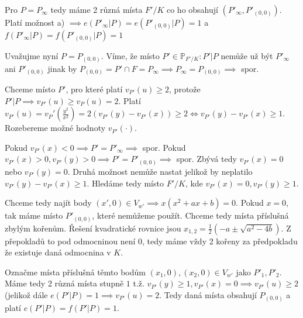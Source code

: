 \documentclass[12pt, a4paper]{article}
\begin{document}
\begin{enumerate}[label=(\alph*)]
    Pro $P=P_\infty$ tedy máme 2 různá místa $F'/K$ co ho obsahují $(P'_\infty, P'_{(0,0)})$. Platí možnost a) $\implies e(P'_\infty|P)=e(P'_{(0,0)}|P)=1$ a $f(P'_\infty|P)=f(P'_{(0,0)}|P)=1$

    Uvažujme nyní $P = P_{(0,0)}$. Víme, že místo $P' \in \mathbb{P}_{F'/K}: P'|P$ nemůže už být $P'_\infty$ ani $P'_{(0,0)}$ jinak by $P_{(0,0)} = P' \cap F = P_\infty \implies P_\infty = P_{(0,0)} \implies$ spor.

    Chceme místo $P'$, pro které platí $v_{P'}(u) \ge 2$, protože $P'|P \implies v_{P'}(u)\ge v_P(u)=2$. Platí $v_{P'}(u)=v_P'(\frac{y^2}{x^2}) = 2 (v_{P'}(y)-v_{P'}(x)) \ge 2 \iff v_{P'}(y)-v_{P'}(x) \ge 1$. Rozebereme možné hodnoty $v_{P'}(\cdot)$.

    Pokud $v_{P'}(x) < 0 \implies P' = P'_\infty \implies$ spor. Pokud $v_{P'}(x) > 0, v_{P'}(y) > 0 \implies P' = P'_{(0,0)} \implies $ spor. Zbývá tedy $v_{P'}(x) = 0$ nebo $v_{P'}(y)=0$. Druhá možnost nemůže nastat jelikož by neplatilo $v_{P'}(y)-v_{P'}(x) \ge 1$. Hledáme tedy místo $F'/K$, kde $v_{P'}(x) = 0, v_{P'}(y) \ge 1$.

    Chceme tedy najít body $(x', 0) \in V_{w'} \implies x(x^2+ax+b)= 0$. Pokud $x = 0$, tak máme místo $P'_{(0,0)}$, které nemůžeme použít. Chceme tedy místa příslušná zbylým kořenům. Řešení kvadratické rovnice jsou $x_{1,2}=\frac{1}{2}(-a\pm \sqrt{a^2-4b})$. Z přepokladů to pod odmocninou není 0, tedy máme vždy 2 kořeny za předpokladu že existuje daná odmocnina v $K$.

    Označme místa příslušná těmto bodům $(x_1, 0), (x_2, 0) \in  V_{w'}$ jako $P'_1, P'_2$. Máme tedy 2 různá místa stupně $1$ t.ž. $v_{P'}(y)\geq 1, v_{P'}(x)=0 \implies v_{P'}(u)\geq 2$ (jelikož dále $e(P'|P)=1 \implies v_{P'}(u)=2$. Tedy daná místa obsahují $P_{(0,0)}$ a platí $e(P'|P)=f(P'|P)=1$.

\end{enumerate}
\end{document}
